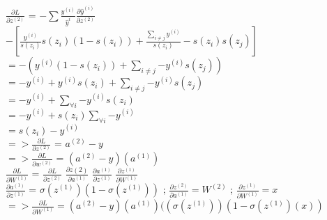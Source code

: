 \documentclass[a4paper]{article}
\theoremstyle{definition}
\newenvironment{soln}{
    \leavevmode\color{blue}\ignorespaces
}{}
\begin{document}
\begin{enumerate}
\begin{soln}
	\begin{center}
	$\frac{\partial L}{\partial z^{(2)}}$ = $- \sum{\frac{y^{(i)}}{\hat y^{{i}}} \frac{\partial \hat y^{(i)}} {\partial z^{(2)}}} $ \\
	$- [ \frac{y^{(i)} } {s(z_i)} s(z_i)(1 - s(z_i)) + \frac {\sum_{i \neq j}{y^{(i)}}} {s(z_i)}  - s(z_i) s(z_j)]$ \\
	$= -(y^{(i)}(1 - s(z_i)) + \sum_{i \neq j} {-y^{(i)} s(z_j)})$ \\
	$= -y^{(i)} + y^{(i)}s(z_i) + \sum_{i \neq j} {-y^{(i)} s(z_j)}$ \\
	$= -y^{(i)} + \sum_{\forall i} {-y^{(i)} s(z_i)}$ \\
	$= -y^{(i)} + s(z_i) \sum_{\forall i} {-y^{(i)} }$ \\
	$ = s(z_i) - y^{(i)} $\\
	$=>\frac {\partial L} {\partial z^{(2)}}$ = $a^{(2)} - y$ \\
	$=>\frac {\partial L} {\partial w^{(2)}}$ = $(a^{(2)} - y)(a^{(1)})$ \\
	
	$\frac{\partial L}{\partial W^{(1)}}$ = $\frac{\partial L}{\partial z^{(2)}}$ $\frac{\partial z{(2)}}{\partial a^{(1)}}$ $\frac{\partial a^{(1)}}{\partial z^{(1)}}$ $\frac{\partial z^{(1)}}{\partial W^{(1)}}$\\	
	$\frac{\partial a^{(1)}}{\partial z^{(1)}}$ = $\sigma(z^{(1)})(1 - \sigma(z^{(1)}))$ ; $\frac{\partial z^{(2)}}{\partial a^{(1)}} = W^{(2)}$ ; $\frac{\partial z^{(1)}}{\partial W^{(1)}} = x$ \\
	$=>\frac {\partial L}{\partial W^{(1)}} = (a^{(2)} - y) (a^{(1)}) ((\sigma(z^{(1)})) (1- \sigma(z^{(1)}) (x))$
	
	
	\end{center}
	

\end{soln}
\end{enumerate}
\end{document}
